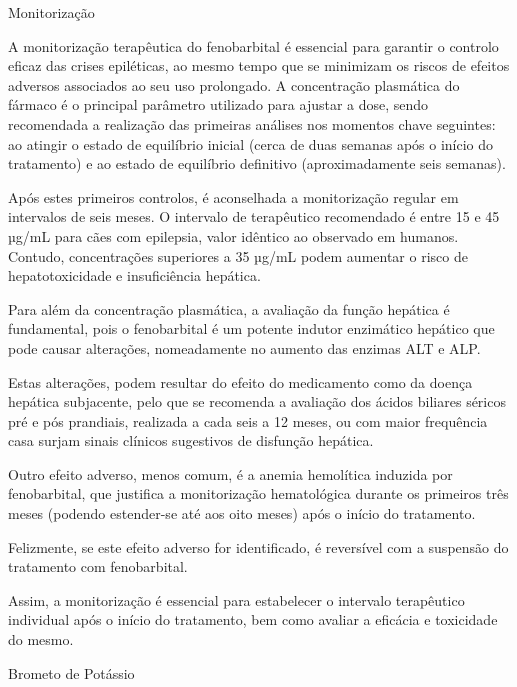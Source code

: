 Monitorização


A monitorização terapêutica do fenobarbital é essencial para garantir o controlo eficaz das crises epiléticas, ao mesmo tempo que se minimizam os riscos de efeitos adversos associados ao seu uso prolongado.\cite{Walton-Clark2022} A concentração plasmática do fármaco é o principal parâmetro utilizado para ajustar a dose, sendo recomendada a realização das primeiras análises nos momentos chave seguintes: ao atingir o estado de equilíbrio inicial (cerca de duas semanas após o início do tratamento) e ao estado de equilíbrio definitivo (aproximadamente seis semanas).\cite{Podell2016} 


Após estes primeiros controlos, é aconselhada a monitorização regular em intervalos de seis meses. O intervalo de terapêutico recomendado é entre 15 e 45 µg/mL para cães com epilepsia, \cite{Walton-Clark2022}\cite{Trinka2023} valor idêntico ao observado em humanos. Contudo, concentrações superiores a 35 µg/mL podem aumentar o risco de hepatotoxicidade e insuficiência hepática.\cite{Walton-Clark2022}\cite{Jukier2023}\cite{Chandler2011}


Para além da concentração plasmática, a avaliação da função hepática é fundamental, pois o fenobarbital é um potente indutor enzimático hepático que pode causar alterações, nomeadamente no aumento das enzimas ALT e ALP. \cite{Gieger2000,Muller2000} 


Estas alterações, podem resultar do efeito do medicamento como da doença hepática subjacente, pelo que se recomenda a avaliação dos ácidos biliares séricos pré e pós prandiais, realizada a cada seis a 12 meses, ou com maior frequência casa surjam sinais clínicos sugestivos de disfunção hepática. \cite{Chandler2011}


Outro efeito adverso, menos comum, é a anemia hemolítica induzida por fenobarbital, que justifica a monitorização hematológica durante os primeiros três meses (podendo estender-se até aos oito meses) após o início do tratamento. \cite{Bersan2014} 

Felizmente, se este efeito adverso for identificado, é reversível com a suspensão do tratamento com fenobarbital. \cite{Bersan2014}


Assim, a monitorização é essencial para estabelecer o intervalo terapêutico individual após o início do tratamento, bem como avaliar a eficácia e toxicidade do mesmo.\cite{Walton-Clark2022}


Brometo de Potássio


